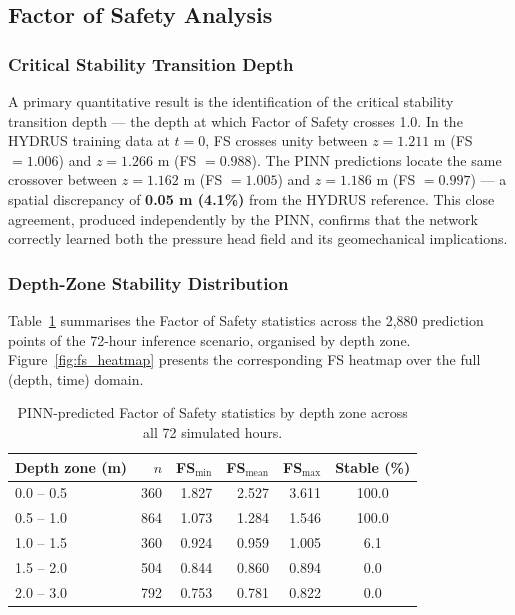 \documentclass[12pt]{report}
\begin{document}
\subsection{Factor of Safety Analysis}

\subsubsection{Critical Stability Transition Depth}

A primary quantitative result is the identification of the critical
stability transition depth — the depth at which Factor of Safety
crosses 1.0. In the HYDRUS training data at $t = 0$, FS crosses
unity between $z = 1.211$ m (FS $= 1.006$) and $z = 1.266$ m
(FS $= 0.988$). The PINN predictions locate the same crossover
between $z = 1.162$ m (FS $= 1.005$) and $z = 1.186$ m
(FS $= 0.997$) — a spatial discrepancy of \textbf{0.05 m (4.1\%)}
from the HYDRUS reference. This close agreement, produced
independently by the PINN, confirms that the network correctly
learned both the pressure head field and its geomechanical
implications.

\subsubsection{Depth-Zone Stability Distribution}

Table~\ref{tab:fs_zones} summarises the Factor of Safety statistics
across the 2,880 prediction points of the 72-hour inference scenario,
organised by depth zone. Figure~\ref{fig:fs_heatmap} presents the
corresponding FS heatmap over the full (depth, time) domain.

\begin{table}[htbp]
\centering
\begin{tabular}{lrrrrc}
\hline
\textbf{Depth zone (m)} & \textbf{$n$} & \textbf{FS$_{\min}$} &
\textbf{FS$_{\text{mean}}$} & \textbf{FS$_{\max}$} &
\textbf{Stable (\%)} \\
\hline
0.0 -- 0.5 & 360 & 1.827 & 2.527 & 3.611 & 100.0 \\
0.5 -- 1.0 & 864 & 1.073 & 1.284 & 1.546 & 100.0 \\
1.0 -- 1.5 & 360 & 0.924 & 0.959 & 1.005 & 6.1   \\
1.5 -- 2.0 & 504 & 0.844 & 0.860 & 0.894 & 0.0   \\
2.0 -- 3.0 & 792 & 0.753 & 0.781 & 0.822 & 0.0   \\
\hline
\end{tabular}
\caption{PINN-predicted Factor of Safety statistics by depth zone
across all 72 simulated hours.}
\label{tab:fs_zones}
\end{table}
\end{document}
